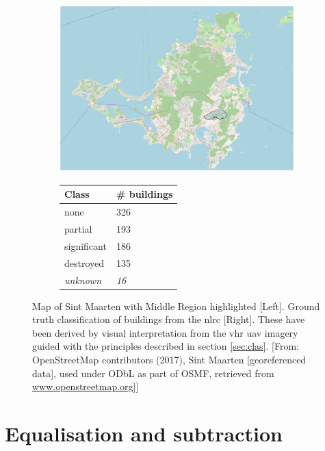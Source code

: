 \begin{figure}[!h]
	\centering
	\captionsetup{justification=raggedright,singlelinecheck=false}
	\begin{subfigure}{.65\textwidth}
		\centering
		\includegraphics[width=.95\linewidth]{figs/Map_large.png}
	\end{subfigure}
	\begin{subfigure}{.275\textwidth}
		\begin{footnotesize}
			\begin{tabular}{ll}
				\toprule
				Class & \# buildings \\
				\midrule
				none & 326\\
				partial & 193\\
				significant & 186\\
				destroyed &	135\\
				\midrule
				\textit{unknown}	& \textit{16}\\
				\bottomrule
			\end{tabular}
		\end{footnotesize}
	\end{subfigure}
	\caption{\footnotesize{Map of Sint Maarten with Middle Region highlighted [Left]. Ground truth classification of buildings from the \ac{nlrc} [Right]. These have been derived by visual interpretation from the \ac{vhr} \ac{uav} imagery guided with the principles described in section \ref{sec:clas}. [From: OpenStreetMap contributors (2017), Sint Maarten [georeferenced data], used under ODbL as part of OSMF, retrieved from \url{www.openstreetmap.org}]]}}
	\label{fig:middle}
\end{figure}

\section{Equalisation and subtraction} \label{sec:Ryun}

